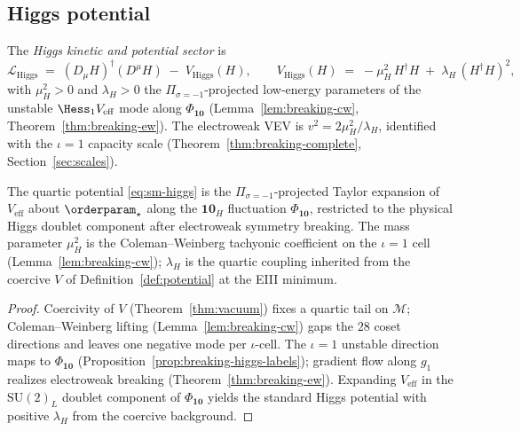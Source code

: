 \subsection{Higgs potential}
\label{sec:sm-lagrangian:higgs}

\begin{definition}\label{def:sm-higgs}
The \emph{Higgs kinetic and potential sector} is
\begin{equation}\label{eq:sm-higgs}
  \mathcal{L}_{\mathrm{Higgs}}
  \;=\;
  (D_\mu H)^\dagger(D^\mu H)
  \;-\;
  V_{\mathrm{Higgs}}(H),
  \qquad
  V_{\mathrm{Higgs}}(H)
  \;=\;
  -\mu_H^2\,H^\dagger H
  \;+\;
  \lambda_H\,(H^\dagger H)^2,
\end{equation}
with $\mu_H^2>0$ and $\lambda_H>0$ the $\Pi_{\sigma=-1}$-projected low-energy
parameters of the unstable $\Hess_1 V_{\mathrm{eff}}$ mode along
$\Phi_{\mathbf{10}}$ (Lemma~\ref{lem:breaking-cw},
Theorem~\ref{thm:breaking-ew}). The electroweak VEV is
$v^2=2\mu_H^2/\lambda_H$, identified with the $\iota=1$ capacity scale
(Theorem~\ref{thm:breaking-complete}, Section~\ref{sec:scales}).
\end{definition}

\begin{lemma}
\label{lem:sm-higgs-derived}
The quartic potential \eqref{eq:sm-higgs} is the $\Pi_{\sigma=-1}$-projected
Taylor expansion of $V_{\mathrm{eff}}$ about $\orderparam_\star$ along the
$\mathbf{10}_H$ fluctuation $\Phi_{\mathbf{10}}$, restricted to the physical
Higgs doublet component after electroweak symmetry breaking. The mass parameter
$\mu_H^2$ is the Coleman--Weinberg tachyonic coefficient on the $\iota=1$ cell
(Lemma~\ref{lem:breaking-cw}); $\lambda_H$ is the quartic coupling inherited
from the coercive $V$ of Definition~\ref{def:potential} at the EIII minimum.
\end{lemma}

\begin{proof}
Coercivity of $V$ (Theorem~\ref{thm:vacuum}) fixes a quartic tail on
$\mathcal{M}$; Coleman--Weinberg lifting (Lemma~\ref{lem:breaking-cw}) gaps
the $28$ coset directions and leaves one negative mode per $\iota$-cell. The
$\iota=1$ unstable direction maps to $\Phi_{\mathbf{10}}$
(Proposition~\ref{prop:breaking-higgs-labels}); gradient flow along $g_1$
realizes electroweak breaking (Theorem~\ref{thm:breaking-ew}). Expanding
$V_{\mathrm{eff}}$ in the $\mathrm{SU}(2)_L$ doublet component of
$\Phi_{\mathbf{10}}$ yields the standard Higgs potential with positive
$\lambda_H$ from the coercive background.
\end{proof}

